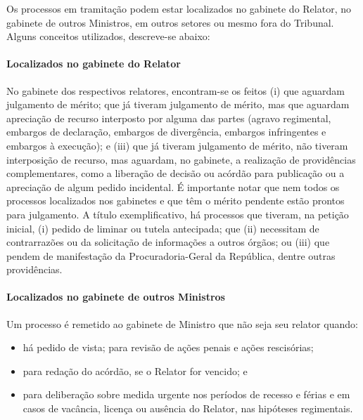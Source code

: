 \documentclass[
]{book}
\providecommand{\tightlist}{%
  \setlength{\itemsep}{0pt}\setlength{\parskip}{0pt}}
\begin{document}
Os processos em tramitação podem estar localizados no gabinete do Relator, no gabinete de outros Ministros, em outros setores ou mesmo fora do Tribunal. Alguns conceitos utilizados, descreve-se abaixo:

\hypertarget{localizados-no-gabinete-do-relator}{%
\paragraph{Localizados no gabinete do Relator}\label{localizados-no-gabinete-do-relator}}

No gabinete dos respectivos relatores, encontram-se os feitos (i) que aguardam julgamento de mérito; que já tiveram julgamento de mérito, mas que aguardam apreciação de recurso interposto por alguma das partes (agravo regimental, embargos de declaração, embargos de divergência, embargos infringentes e embargos à execução); e (iii) que já tiveram julgamento de mérito, não tiveram interposição de recurso, mas aguardam, no gabinete, a realização de providências complementares, como a liberação de decisão ou acórdão para publicação ou a apreciação de algum pedido incidental.
É importante notar que nem todos os processos localizados nos gabinetes e que têm o mérito pendente estão prontos para julgamento. A título exemplificativo, há processos que tiveram, na petição inicial, (i) pedido de liminar ou tutela antecipada; que (ii) necessitam de contrarrazões ou da solicitação de informações a outros órgãos; ou (iii) que pendem de manifestação da Procuradoria-Geral da República, dentre outras providências.

\hypertarget{localizados-no-gabinete-de-outros-ministros}{%
\paragraph{Localizados no gabinete de outros Ministros}\label{localizados-no-gabinete-de-outros-ministros}}

Um processo é remetido ao gabinete de Ministro que não seja seu relator quando:

\begin{itemize}
\tightlist
\item
  há pedido de vista; para revisão de ações penais e ações rescisórias;
\item
  para redação do acórdão, se o Relator for vencido; e
\item
  para deliberação sobre medida urgente nos períodos de recesso e férias e em casos de vacância, licença ou ausência do Relator, nas hipóteses regimentais.
\end{itemize}
\end{document}
